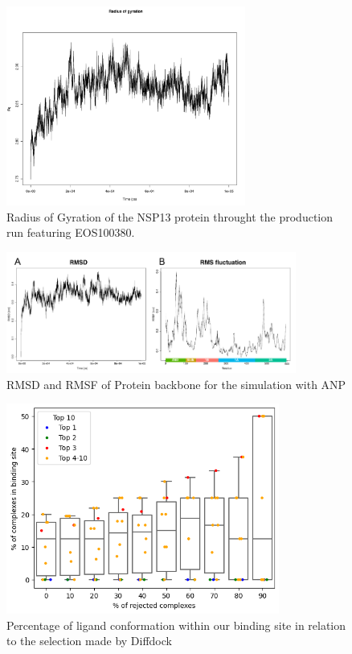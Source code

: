\documentclass[11pt, letterpaper, titlepage]{article}
\begin{document}
\begin{figure}[h]
  \begin{center}
    \includegraphics[width=0.7\textwidth]{gyration_protein.pdf}
  \end{center}
  \caption{Radius of Gyration of the NSP13 protein throught the production run featuring EOS100380.}\label{gyr}
\end{figure}

\begin{figure}[h]
  \begin{center}
    \includegraphics[width=0.85\textwidth]{rms_ANP.pdf}
  \end{center}
  \caption{RMSD and RMSF of Protein backbone for the simulation with ANP}\label{anp}
\end{figure}

\begin{figure}[h]
  \begin{center}
    \includegraphics[width=0.8\textwidth]{diffdock_percentage_graph}
  \end{center}
  \caption{Percentage of ligand conformation within our binding site in relation to the selection made by Diffdock}\label{Diffdock_plot}
\end{figure}


\pagebreak
\FloatBarrier
\renewcommand{\bibname}{References}  %
\printbibliography
\end{document}
